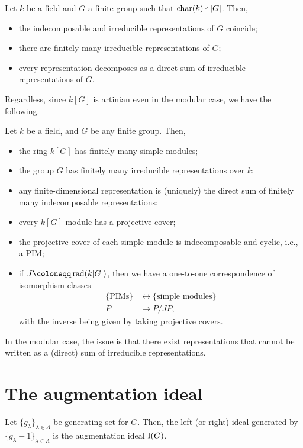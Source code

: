 \documentclass[12pt]{article}
\begin{document}
\begin{cor}
	Let $k$ be a field and $G$ a finite group such that $\operatorname{char}(k) \nmid {\left\lvert G \right\lvert}$. 
	Then, 
	\begin{itemize}
		\item the indecomposable and irreducible representations of $G$ coincide;
		\item there are finitely many irreducible representations of $G$;
		\item every representation decomposes as a direct sum of irreducible representations of $G$.
	\end{itemize}
\end{cor}

Regardless, since $k[G]$ is artinian even in the modular case, we have the following.
\begin{thm}
	Let $k$ be a field, and $G$ be any finite group. 
	Then,
	\begin{itemize}
		\item the ring $k[G]$ has finitely many simple modules;
		\item the group $G$ has finitely many irreducible representations over $k$;
		\item any finite-dimensional representation is (uniquely) the direct sum of finitely many indecomposable representations;
		\item every $k[G]$-module has a projective cover;
		\item the projective cover of each simple module is indecomposable and cyclic, i.e., a PIM;
		\item if $J \coloneqq \rad(k[G])$, then we have a one-to-one correspondence of isomorphism classes
		\begin{align*} 
			\{\text{PIMs}\} & \leftrightarrow \{\text{simple modules}\} \\
			P & \mapsto P/JP,
		\end{align*}
		with the inverse being given by taking projective covers.
	\end{itemize}
\end{thm}
In the modular case, the issue is that there exist representations that cannot be written as a (direct) sum of irreducible representations.

\section{The augmentation ideal}

\begin{thm}
	Let $\{g_{\lambda}\}_{\lambda \in \Lambda}$ be generating set for $G$. 
	Then, the left (or right) ideal generated by $\{g_{\lambda} - 1\}_{\lambda \in \Lambda}$ is the augmentation ideal $\operatorname{I}(G)$.
\end{thm}
\end{document}
